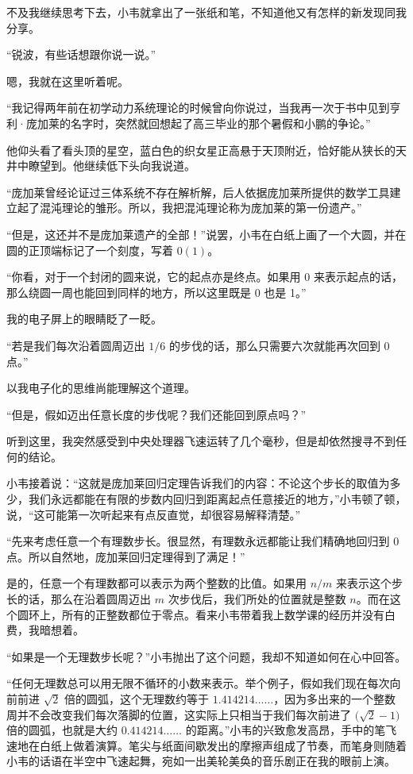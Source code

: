 \documentclass[punct=kaiming, zihao=5, openany, fontset=sikou]{ctexbook}
\begin{document}
不及我继续思考下去，小韦就拿出了一张纸和笔，不知道他又有怎样的新发现同我分享。

“锐波，有些话想跟你说一说。”

嗯，我就在这里听着呢。

“我记得两年前在初学动力系统理论的时候曾向你说过，当我再一次于书中见到亨利·庞加莱的名字时，突然就回想起了高三毕业的那个暑假和小鹏的争论。”

他仰头看了看头顶的星空，蓝白色的织女星正高悬于天顶附近，恰好能从狭长的天井中瞭望到。他继续低下头向我说道。

“庞加莱曾经论证过三体系统不存在解析解，后人依据庞加莱所提供的数学工具建立起了混沌理论的雏形。所以，我把混沌理论称为庞加莱的第一份遗产。”

“但是，这还并不是庞加莱遗产的全部！”说罢，小韦在白纸上画了一个大圆，并在圆的正顶端标记了一个刻度，写着 $0(1)$。

“你看，对于一个封闭的圆来说，它的起点亦是终点。如果用 0 来表示起点的话，那么绕圆一周也能回到同样的地方，所以这里既是 0 也是 1。”

我的电子屏上的眼睛眨了一眨。

“若是我们每次沿着圆周迈出 $1/6$ 的步伐的话，那么只需要六次就能再次回到 0 点。”

以我电子化的思维尚能理解这个道理。

“但是，假如迈出任意长度的步伐呢？我们还能回到原点吗？”

听到这里，我突然感受到中央处理器飞速运转了几个毫秒，但是却依然搜寻不到任何的结论。

小韦接着说：“这就是庞加莱回归定理告诉我们的内容：不论这个步长的取值为多少，我们永远都能在有限的步数内回归到距离起点任意接近的地方，”小韦顿了顿，说，“这可能第一次听起来有点反直觉，却很容易解释清楚。”

“先来考虑任意一个有理数步长。很显然，有理数永远都能让我们精确地回归到 0 点。所以自然地，庞加莱回归定理得到了满足！”

是的，任意一个有理数都可以表示为两个整数的比值。如果用 $n/m$ 来表示这个步长的话，那么在沿着圆周迈出 $m$ 次步伐后，我们所处的位置就是整数 $n$。而在这个圆环上，所有的正整数都位于零点。看来小韦带着我上数学课的经历并没有白费，我暗想着。

“如果是一个无理数步长呢？”小韦抛出了这个问题，我却不知道如何在心中回答。

“任何无理数总可以用无限不循环的小数来表示。举个例子，假如我们现在每次向前前进 $\sqrt{2}$ 倍的圆弧，这个无理数约等于 $1.414214\ldots\ldots$，因为多出来的一个整数周并不会改变我们每次落脚的位置，这实际上只相当于我们每次前进了 $\bigl(\sqrt{2}-1\bigr)$ 倍的圆弧，也就是大约 $0.414214\ldots\ldots$ 的距离。”小韦的兴致愈发高昂，手中的笔飞速地在白纸上做着演算。笔尖与纸面间歇发出的摩擦声组成了节奏，而笔身则随着小韦的话语在半空中飞速起舞，宛如一出美轮美奂的音乐剧正在我的眼前上演。
\end{document}
